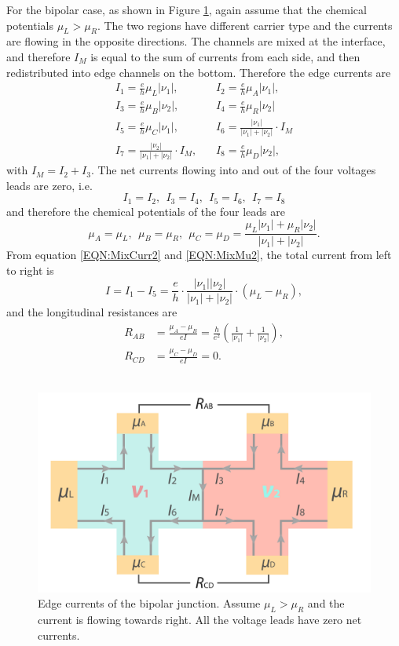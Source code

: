 \documentclass[pdflatex, sectionletters, 12pt]{pittetd}    %
\begin{document}
For the bipolar case, as shown in Figure \ref{FIG:Bipolar}, again assume that the chemical potentials $\mu_L > \mu_R$. The two regions have different carrier type and the currents are flowing in the opposite directions. The channels are mixed at the interface, and therefore $I_M$ is equal to the sum of currents from each side, and then redistributed into edge channels on the bottom. Therefore the edge currents are
\begin{equation}
\label{EQN:MixCurr2}
\begin{split}
I_1 = \frac{e}{h}\mu_L|\nu_1|, & \ \ \ \   I_2 = \frac{e}{h}\mu_A|\nu_1|, \\
I_3 = \frac{e}{h}\mu_B|\nu_2|, & \ \ \ \ I_4 = \frac{e}{h}\mu_R|\nu_2| \\
I_5 = \frac{e}{h}\mu_C|\nu_1|, & \ \ \ \  I_6 = \frac{|\nu_1|}{|\nu_1|+|\nu_2|} \cdot I_M \\
I_7 = \frac{|\nu_2|}{|\nu_1|+|\nu_2|} \cdot I_M, & \ \ \ \ I_8 = \frac{e}{h}\mu_D|\nu_2|,
\end{split}
\end{equation}
with $I_M = I_2 + I_3$. The net currents flowing into and out of the four voltages leads are zero, i.e.
$$
I_1 = I_2, \ \ I_3 = I_4, \ \ I_5 = I_6, \ \ I_7 = I_8
$$
and therefore the chemical potentials of the four leads are
\begin{equation}
\label{EQN:MixMu2}
\mu_A = \mu_L, \ \ \mu_B = \mu_R, \ \ \mu_C = \mu_D = \frac{\mu_L|\nu_1| + \mu_R|\nu_2|}{|\nu_1| + |\nu_2|}.
\end{equation}
From equation \ref{EQN:MixCurr2} and \ref{EQN:MixMu2}, the total current from left to right is 
$$
I = I_1 - I_5 = \frac{e}{h} \cdot \frac{|\nu_1||\nu_2|}{|\nu_1| + |\nu_2|} \cdot (\mu_L - \mu_R),
$$ 
and the longitudinal resistances are 
\begin{equation}
\label{EQN:Mixing2}
\begin{split}
R_{AB} & = \frac{\mu_A - \mu_B}{eI} = \frac{h}{e^2}\left(\frac{1}{|\nu_1|} + \frac{1}{|\nu_2|}\right), \\
R_{CD} & = \frac{\mu_C - \mu_D}{eI} = 0.
\end{split}
\end{equation}
\\

\begin{figure}[h!]
	\centering
	\includegraphics[width=.7\textwidth]{Drawing/Bipolar.pdf}
	\caption{Edge currents of the bipolar junction. Assume $\mu_L > \mu_R$ and the current is flowing towards right. All the voltage leads have zero net currents.}
	\label{FIG:Bipolar}
\end{figure}
\end{document}
